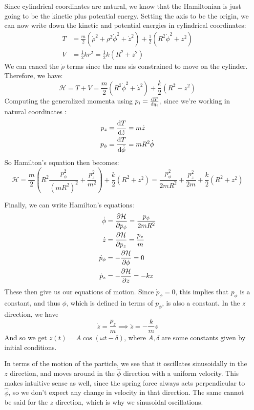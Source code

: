 \documentclass[10pt]{article}
\begin{document}
	\begin{solution}
		Since cylindrical coordinates are natural, we know that the Hamiltonian is just going to be the kinetic
		plus potential energy. Setting the axis to be the origin, we can now write down the kinetic and potential
		energies in cylindrical coordinates:
		\begin{align*}
			T &=  \frac{m}{2}(\dot \rho^2 +\rho^2 \dot \phi^2 + \dot z^2) + \frac{1}{2}(R^2 \dot \phi^2 + z^2)\\
			V &= \frac{1}{2}kr^2 = \frac{1}{2}k(R^2 + z^2)
		\end{align*}
		We can cancel the $\dot \rho$ terms since the mas sis constrained to move on the cylinder. Therefore, 
		we have: 
		\[
		\mathcal H = T + V = \frac{m}{2}(R^2 \dot \phi^2 + \dot z^2) + \frac{k}{2}(R^2 + z^2)
		\] 
		Computing the generalized momenta using $p_i = \dv{T}{q_i}$, since we're working in natural 
		coordinates :
		\begin{align*}
			p_z &=  \dv{T}{\dot z} = m\dot z \\
			p_\phi &= \dv{T}{\dot \phi} = mR^2 \dot \phi
		\end{align*}
		So Hamilton's equation then becomes:
		\[
			\mathcal H = \frac{m}{2}\left(R^2 \frac{p_{\phi}^2}{(mR^2)^2} + \frac{p_z^2}{m^2}\right) + 
			\frac{k}{2}(R^2 + z^2) = \frac{p_\phi^2}{2mR^2} + \frac{p_z^2}{2m} + \frac{k}{2}(R^2 + z^2)
		\] 	

		Finally, we can write Hamilton's equations:
		\begin{align*}
			\dot \phi &= \pdv{\mathcal H}{p_\phi} = \frac{p_\phi}{2mR^2}\\
			\dot z &= \pdv{\mathcal H}{p_z} = \frac{p_z}{m}\\
			\dot p_\phi &= -\pdv{\mathcal H}{\phi} = 0\\
			\dot p_z &= -\pdv{\mathcal H}{z} = -kz
		\end{align*}
		These then give us our equations of motion. Since $\dot p_\phi = 0$, this implies that $p_\phi$ is a
		constant, and thus $\dot \phi$, which is defined in terms of $p_\phi$, is also a constant. In the $z$
		direction, we have 
		\[
			\dot z = \frac{p_z}{m} \implies \ddot z = -\frac{k}{m} z
		\] 
		And so we get $z(t) = A\cos(\omega t - \delta)$, where $A, \delta$ are some constants  given by initial 
		conditions. 

		In terms of the motion of the particle, we see that it oscillates sinusoidally in the $z$ direction, 
		and moves around in the $\hat{\phi}$ direction with a uniform velocity. This makes intuitive 
		sense as well, since the spring force always acts perpendicular to $\hat{ \phi}$, so we don't expect
		any change in velocity in that direction. The same cannot be said for the $z$ direction, which is why
		we sinusoidal oscillations. 
	\end{solution}
\end{document}
